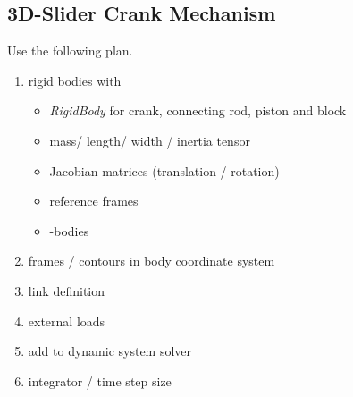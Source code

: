 \subsection{3D-Slider Crank Mechanism}
Use the following plan.
\begin{enumerate}
\item rigid bodies with
\begin{itemize}
\item \emph{RigidBody} for crank, connecting rod, piston and block
\item mass/ length/ width / inertia tensor
\item Jacobian matrices (translation / rotation)
\item reference frames
\item \OpenMBV{}-bodies
\end{itemize}

\item frames / contours in body coordinate system
\item link definition
\item external loads
\item add to dynamic system solver
\item integrator / time step size
\end{enumerate}


